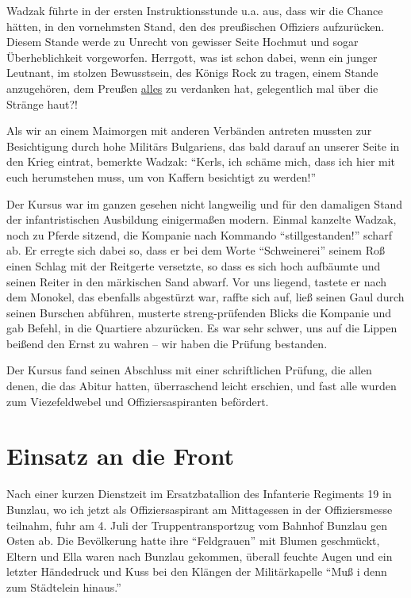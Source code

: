 \documentclass[a5paper,pagesize,10pt,twoside=true]{scrbook}
\renewcommand{\marginpar}[2][]{}
\begin{document}
Wadzak führte in der ersten Instruktionsstunde u.a. aus, dass wir die Chance hätten, in den vornehmsten Stand, den des preußischen Offiziers aufzurücken. Diesem Stande werde zu Unrecht von gewisser Seite Hochmut und sogar Überheblichkeit vorgeworfen. Herrgott, was ist schon dabei, wenn ein junger Leutnant, im stolzen Bewusstsein, des Königs Rock zu tragen, einem Stande anzugehören, dem Preußen \underline{alles} zu verdanken hat, gelegentlich mal über die Stränge haut?!

Als wir an einem Maimorgen mit anderen Verbänden antreten mussten zur Besichtigung durch hohe Militärs Bulgariens, das bald darauf an unserer Seite in den Krieg eintrat, bemerkte Wadzak: \enquote{Kerls, ich schäme mich, dass ich hier mit euch herumstehen muss, um von Kaffern besichtigt zu werden!}

\marginpar{183}
Der Kursus war im ganzen gesehen nicht langweilig und für den damaligen Stand der infantristischen Ausbildung einigermaßen modern. Einmal kanzelte Wadzak, noch zu Pferde sitzend, die Kompanie nach Kommando \enquote{stillgestanden!} scharf ab. Er erregte sich dabei so, dass er bei dem Worte \enquote{Schweinerei} seinem Roß einen Schlag mit der Reitgerte versetzte, so dass es sich hoch aufbäumte und seinen Reiter in den märkischen Sand abwarf. Vor uns liegend, tastete er nach dem Monokel, das ebenfalls abgestürzt war, raffte sich auf, ließ seinen Gaul durch seinen Burschen abführen, musterte streng-prüfenden Blicks die Kompanie und gab Befehl, in die Quartiere abzurücken. Es war sehr schwer, uns auf die Lippen beißend den Ernst zu wahren -- wir haben die Prüfung bestanden.

Der Kursus fand seinen Abschluss mit einer schriftlichen Prüfung, die allen denen, die das Abitur hatten, überraschend leicht erschien, und fast alle wurden zum Viezefeldwebel und Offiziersaspiranten befördert.


\section{Einsatz an die Front}
Nach einer kurzen Dienstzeit im Ersatzbatallion des Infanterie Regiments 19 in Bunzlau, wo ich jetzt als Offiziersaspirant am Mittagessen in der Offiziersmesse teilnahm, fuhr am 4. Juli der Truppentransportzug vom Bahnhof Bunzlau gen Osten ab. Die Bevölkerung hatte ihre \enquote{Feldgrauen} mit Blumen geschmückt, Eltern und Ella waren nach Bunzlau gekommen, überall feuchte Augen und ein letzter Händedruck und Kuss bei den Klängen der Militärkapelle \enquote{Muß i denn zum Städtelein hinaus.}
\end{document}

